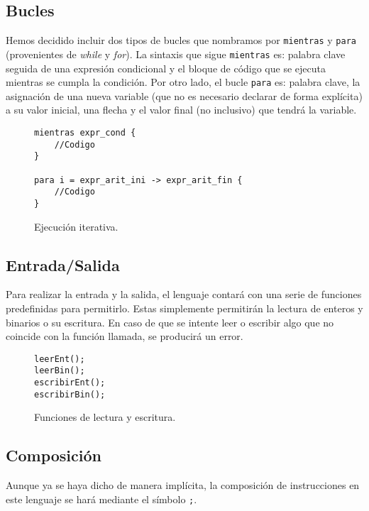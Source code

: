 \subsection*{Bucles}
Hemos decidido incluir dos tipos de bucles que nombramos por
\lstinline{mientras} y \lstinline{para}
(provenientes de \textit{while} y \textit{for}). La sintaxis que sigue
\lstinline{mientras} es: palabra clave seguida de una expresión condicional y el bloque de
código que se ejecuta mientras se cumpla la condición. Por otro lado, el bucle
\lstinline{para} es: palabra clave, la asignación de una nueva variable (que no es
necesario declarar de forma explícita) a su valor inicial, una flecha y el valor
final (no inclusivo) que tendrá la variable.
\begin{figure}[H]
    \centering
    \begin{lstlisting}
mientras expr_cond {
    //Codigo
}

para i = expr_arit_ini -> expr_arit_fin {
    //Codigo
}
    \end{lstlisting}
    \caption{Ejecución iterativa.}
\end{figure}

\subsection*{Entrada/Salida}
Para realizar la entrada y la salida, el lenguaje contará con una serie de
funciones predefinidas para permitirlo. Estas simplemente permitirán la lectura
de enteros y binarios o su escritura. En caso de que se intente leer o escribir
algo que no coincide con la función llamada, se producirá un error.
\begin{figure}[H]
    \centering
    \begin{lstlisting}
leerEnt();
leerBin();
escribirEnt();
escribirBin();
    \end{lstlisting}
    \caption{Funciones de lectura y escritura.}
\end{figure}


\subsection*{Composición}
Aunque ya se haya dicho de manera implícita, la composición de instrucciones en
este lenguaje se hará mediante el símbolo \lstinline{;}.

